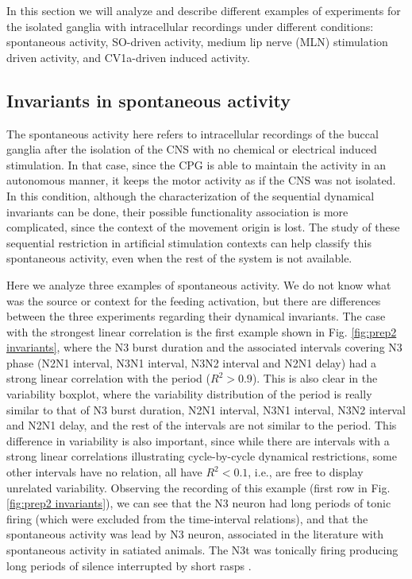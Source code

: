 
In this section we will analyze and describe different examples of experiments for the isolated ganglia with intracellular recordings under different conditions: spontaneous activity, SO-driven activity, medium lip nerve (MLN) stimulation driven activity, and CV1a-driven induced activity.

\subsection{Invariants in spontaneous activity}
The spontaneous activity here refers to intracellular recordings of the buccal ganglia after the isolation of the CNS with no chemical or electrical induced stimulation. In that case, since the CPG is able to maintain the activity in an autonomous manner, it keeps the motor activity as if the CNS was not isolated. In this condition, although the characterization of the sequential dynamical invariants can be done, their possible functionality association is more complicated, since the context of the movement origin is lost. The study of these sequential restriction in artificial stimulation contexts can help classify this spontaneous activity, even when the rest of the system is not available. 

Here we analyze three examples of spontaneous activity. We do not know what was the source or context for the feeding activation, but there are differences between the three experiments regarding their dynamical invariants. The case with the strongest linear correlation is the first example shown in Fig. \ref{fig:prep2 invariants}, where the N3 burst duration and the associated intervals covering N3 phase (N2N1 interval, N3N1 interval, N3N2 interval and N2N1 delay) had a strong linear correlation with the period ($R^2 > 0.9$). This is also clear in the variability boxplot, where the variability distribution of the period is really similar to that of N3 burst duration, N2N1 interval, N3N1 interval, N3N2 interval and N2N1 delay, and the rest of the intervals are not similar to the period. This difference in variability is also important, since while there are intervals with a strong linear correlations illustrating cycle-by-cycle dynamical restrictions, some other intervals have no relation, all have $R^2 < 0.1$, i.e., are free to display unrelated variability. Observing the recording of this example (first row in Fig. \ref{fig:prep2 invariants}), we can see that the N3 neuron had long periods of tonic firing (which were excluded from the time-interval relations), and that the spontaneous activity was lead by N3 neuron, associated in the literature with spontaneous activity in satiated animals. The N3t was tonically firing producing long periods of silence interrupted by short rasps \parencite{staras_loss_2003,benjamin_distributed_2012}.

